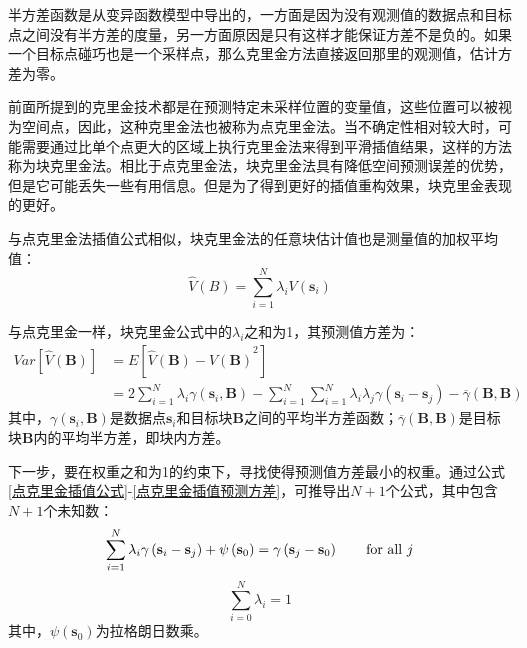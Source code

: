 半方差函数是从变异函数模型中导出的，一方面是因为没有观测值的数据点和目标点之间没有半方差的度量，另一方面原因是只有这样才能保证方差不是负的。如果一个目标点碰巧也是一个采样点，那么克里金方法直接返回那里的观测值，估计方差为零。

前面所提到的克里金技术都是在预测特定未采样位置的变量值，这些位置可以被视为空间点，因此，这种克里金法也被称为点克里金法。当不确定性相对较大时，可能需要通过比单个点更大的区域上执行克里金法来得到平滑插值结果，这样的方法称为块克里金法。相比于点克里金法，块克里金法具有降低空间预测误差的优势，但是它可能丢失一些有用信息。但是为了得到更好的插值重构效果，块克里金表现的更好。

与点克里金法插值公式相似，块克里金法的任意块估计值也是测量值的加权平均值：
\begin{equation}
    \hat{V}\left( B \right) = \sum_{i=1}^{N} \lambda_{i} V \left( \mathbf{s}_{i} \right)
    \label{块克里金插值公式}
\end{equation}

与点克里金一样，块克里金公式中的$ \lambda_{i} $之和为1，其预测值方差为：
\begin{equation}
    \begin{split}
        Var\left[ \hat{V} \left( \mathbf{B} \right) \right]
        & = E\left[ {\hat{V}\left( \mathbf{B} \right) - V\left( \mathbf{B} \right)}^{2} \right]     \\
        & = 2 \sum_{i=1}^{N} \lambda_{i} \gamma\left( \mathbf{s}_{i} , \mathbf{B} \right) - \sum_{i=1}^{N} \sum_{i=1}^{N} \lambda_{i} \lambda_{j} \gamma\left( \mathbf{s}_{i} - \mathbf{s}_{j} \right) - \overline{\gamma} \left( \mathbf{B}, \mathbf{B} \right)
    \end{split}
    \label{块克里金插值预测方差}
\end{equation}
其中，$ \gamma\left( \mathbf{s}_{i} , \mathbf{B} \right) $是数据点$ \mathbf{s}_{i} $和目标块$ \mathbf{B} $之间的平均半方差函数；$ \overline{\gamma} \left( \mathbf{B}, \mathbf{B} \right) $是目标块$ \mathbf{B} $内的平均半方差，即块内方差。

下一步，要在权重之和为1的约束下，寻找使得预测值方差最小的权重。通过公式\ref{点克里金插值公式}-\ref{点克里金插值预测方差}，可推导出$ N+1 $个公式，其中包含$ N+1 $个未知数：
\begin{equation}
    \sum_{i=1}^{N} \lambda_{i} \gamma \left( \mathbf{s}_{i} - \mathbf{s}_{j} \right) + \psi \left( \mathbf{s}_{0} \right) = \gamma \left( \mathbf{s}_{j} - \mathbf{s}_{0} \right) \qquad \text{for all $ j $}
    \label{点克里金法N个方程}
\end{equation}
\begin{equation}
    \sum_{i=0}^{N}\lambda_{i} = 1
    \label{点克里金法N+1个方程}
\end{equation}
其中，$ \psi \left( \mathbf{s}_{0} \right) $为拉格朗日数乘。


